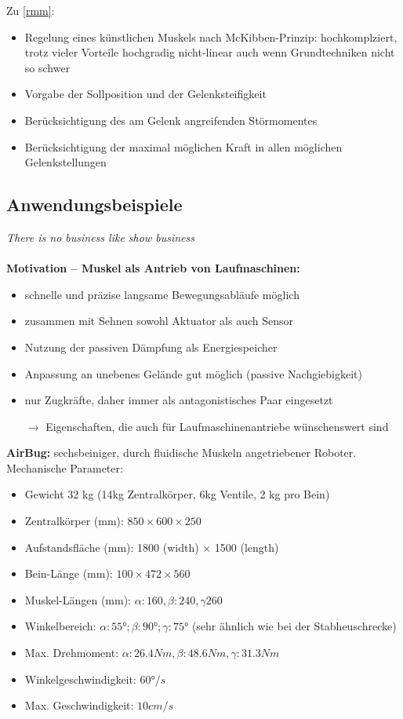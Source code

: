 Zu \autoref{rmm}:
\begin{itemize}
	\item Regelung eines künstlichen Muskels nach McKibben-Prinzip: hochkomplziert, trotz vieler Vorteile hochgradig nicht-linear auch wenn Grundtechniken nicht so schwer
	\item Vorgabe der Sollposition und der Gelenksteifigkeit
	\item Berücksichtigung des am Gelenk angreifenden Störmomentes
	\item Berücksichtigung der maximal möglichen Kraft in allen möglichen Gelenkstellungen
\end{itemize}
\subsection{Anwendungsbeispiele}
\emph{There is no business like show business}\\ \\
\textbf{Motivation – Muskel als Antrieb von Laufmaschinen:}
\begin{itemize}
	\item schnelle und präzise langsame Bewegungsabläufe möglich
	\item zusammen mit Sehnen sowohl Aktuator als auch Sensor
	\item Nutzung der passiven Dämpfung als Energiespeicher
	\item Anpassung an unebenes Gelände gut möglich (passive Nachgiebigkeit)
	\item nur Zugkräfte, daher immer als antagonistisches Paar eingesetzt
	\item[$\rightarrow$] Eigenschaften, die auch für Laufmaschinenantriebe wünschenswert sind
\end{itemize}
\textbf{AirBug:} sechsbeiniger, durch fluidische Muskeln angetriebener Roboter.\\
Mechanische Parameter:
\begin{itemize}
	\setlength\itemsep{0em}
	\item Gewicht 32 kg (14kg Zentralkörper, 6kg Ventile, 2 kg pro Bein)
	\item Zentralkörper (mm): $850 \times 600 \times 250$
	\item Aufstandsfläche (mm): 1800 (width) $\times$ 1500 (length)
	\item Bein-Länge (mm): $100 \times 472 \times 560$
	\item Muskel-Längen (mm): $\alpha: 160, \beta: 240, \gamma 260$
	\item Winkelbereich: $\alpha: 55°; \beta: 90°; \gamma: 75°$ (sehr ähnlich wie bei der Stabheuschrecke)
	\item Max. Drehmoment: $\alpha: 26.4Nm, \beta: 48.6Nm, \gamma: 31.3Nm$
	\item Winkelgeschwindigkeit: $60°/s$
	\item Max. Geschwindigkeit: $10cm/s$
\end{itemize}
